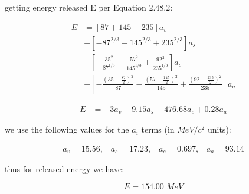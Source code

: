 \documentclass[11pt]{article}
\theoremstyle{definition}
\begin{document}


getting energy released E per Equation 2.48.2:

\begin{align*}
    E &= [87+145-235]a_v\\
    &+ [-87^{2/3} - 145^{2/3} + 235^{2/3}]a_s\\
    &+ \left[ -\frac{35^2}{87^{1/3}} - \frac{57^2}{145^{1/3}} + \frac{92^2}{235^{1/3}}\right]a_c \tag{2.57.4}\\
    &+ \left[ -\frac{(35-\frac{87}{2})^2}{87} - \frac{(57-\frac{145}{2})^2}{145} + \frac{(92-\frac{235}{2})^2}{235}\right]a_a
\end{align*}


\begin{align*}
    E &= -3a_v - 9.15a_s + 476.68 a_c + 0.28a_a \tag{2.57.5}
\end{align*}


we use the following values for the $a_i$ terms (in $MeV/c^2$ units):

\begin{align*}
    a_v = 15.56,\;\;\; a_s = 17.23,\;\;\; a_c = 0.697,\;\;\; a_a = 93.14 \tag{2.58}
\end{align*}

thus for released energy we have:

\begin{equation*}
\boxed{
    E = 154.00\; MeV
}
\end{equation*}

\end{document}
